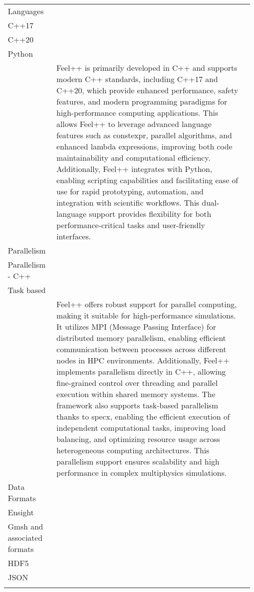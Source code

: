 \begin{table}[h!]
{{\begin{longtable}{lp{}p{}}
        \rowcolor{white}Languages  & \begin{tabular}{l}
C++\\
C++17\\
C++20\\
Python\\
\end{tabular} & Feel++ is primarily developed in C++ and supports modern C++ standards, including C++17 and C++20, which provide enhanced performance, safety features, and modern programming paradigms for high-performance computing applications. This allows Feel++ to leverage advanced language features such as constexpr, parallel algorithms, and enhanced lambda expressions, improving both code maintainability and computational efficiency. Additionally, Feel++ integrates with Python, enabling scripting capabilities and facilitating ease of use for rapid prototyping, automation, and integration with scientific workflows. This dual-language support provides flexibility for both performance-critical tasks and user-friendly interfaces. \\
        \rowcolor{numpexlightergray}Parallelism  & \begin{tabular}{l}
MPI\\
Parallelism - C++\\
Task based\\
\end{tabular} & Feel++ offers robust support for parallel computing, making it suitable for high-performance simulations. It utilizes MPI (Message Passing Interface) for distributed memory parallelism, enabling efficient communication between processes across different nodes in HPC environments. Additionally, Feel++ implements parallelism directly in C++, allowing fine-grained control over threading and parallel execution within shared memory systems. The framework also supports task-based parallelism thanks to specx, enabling the efficient execution of independent computational tasks, improving load balancing, and optimizing resource usage across heterogeneous computing architectures. This parallelism support ensures scalability and high performance in complex multiphysics simulations.\\
        \rowcolor{white}Data Formats  & \begin{tabular}{l}
Data-management system\\
Ensight\\
Gmsh and associated formats\\
HDF5\\
JSON\\

\end{tabular}
\end{longtable}}}
\end{table}
